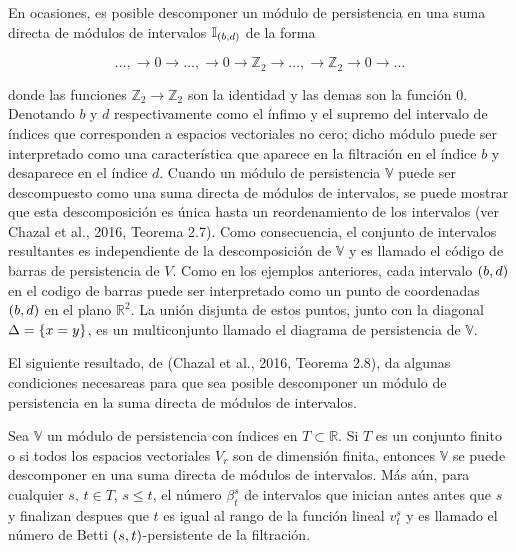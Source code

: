 En ocasiones, es posible descomponer un m\'odulo de persistencia en una suma directa de m\'odulos de intervalos $\mathbb{I}_{\left(b,d\right)}$ de la forma

\begin{equation*}
    \dots, \rightarrow 0 \rightarrow \dots, \rightarrow 0 \rightarrow \mathbb{Z}_{2} \rightarrow \dots, \rightarrow \mathbb{Z}_{2} \rightarrow 0 \rightarrow \dots
\end{equation*}

\noindent donde las funciones $\mathbb{Z}_{2}\rightarrow\mathbb{Z}_{2}$ son la identidad y las demas son la funci\'on $0$.
Denotando $b$ y $d$ respectivamente como el \'infimo y el supremo del intervalo de \'indices que corresponden a espacios vectoriales no cero;
dicho m\'odulo puede ser interpretado como una caracter\'istica que aparece en la filtraci\'on en el \'indice $b$ y desaparece en el \'indice $d$.
Cuando un m\'odulo de persistencia $\mathbb{V}$ puede ser descompuesto como una suma directa de m\'odulos de intervalos,
se puede mostrar que esta descomposici\'on es \'unica hasta un reordenamiento de los intervalos
(ver Chazal et al., 2016\cite{Chazal2016a}, Teorema 2.7).
Como consecuencia, el conjunto de intervalos resultantes es independiente de la descomposici\'on de $\mathbb{V}$
y es llamado el c\'odigo de barras de persistencia de $V$.
Como en los ejemplos anteriores,
cada intervalo $\left(b,d\right)$ en el codigo de barras puede ser interpretado como un punto de coordenadas $\left(b,d\right)$ en el plano $\mathbb{R}^{2}$.
La uni\'on disjunta de estos puntos, junto con la diagonal $\Delta =\left\{x=y\right\}$,
es un multiconjunto llamado el diagrama de persistencia de $\mathbb{V}$.

El siguiente resultado, de (Chazal et al., 2016\cite{Chazal2016a}, Teorema 2.8),
da algunas condiciones necesareas para que sea posible descomponer un m\'odulo de persistencia
en la suma directa de m\'odulos de intervalos.

\begin{teorema}
    Sea $\mathbb{V}$ un m\'odulo de persistencia con \'indices en $T\subset\mathbb{R}$.
    Si $T$ es un conjunto finito o si todos los espacios vectoriales $V_{r}$ son de dimensi\'on finita,
    entonces $\mathbb{V}$ se puede descomponer en una suma directa de m\'odulos de intervalos.
    M\'as a\'un, para cualquier $s,\hspace{2pt}t\in T$, $s\leq t$,
    el n\'umero $\beta_{t}^{s}$ de intervalos que inician antes antes que $s$ y finalizan despues que $t$
    es igual al rango de la funci\'on lineal $v_{t}^{s}$
    y es llamado el n\'umero de Betti \linebreak $\left(s, t\right)$-persistente de la filtraci\'on.
\end{teorema}

